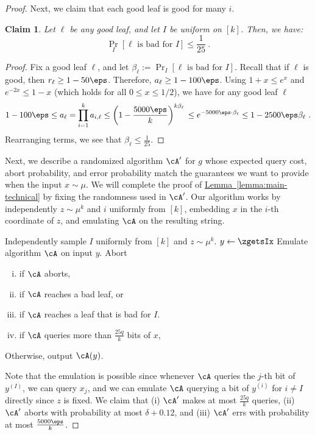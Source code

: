 \documentclass[11pt]{article}
\numberwithin{equation}{section}
\newtheorem{claim}[theorem]{Claim}
\theoremstyle{definition}
\theoremstyle{plain}
\newcommand{\expref}[2]{\hyperref[#2]{#1~\ref{#2}}}
\begin{document}
\begin{proof}
  Next, we claim that each good leaf is good for many $i$.
  \begin{claim}\label{claim:leaf-good-i}
    Let $\ell$ be any good leaf, and let $I$ be uniform on $[k]$.
    Then, we have: $$\Pr_I[\ell \text{ is bad for } I] \leq \frac{1}{25}\ .$$
  \end{claim}
  \begin{proof}
    Fix a good leaf $\ell$, and let
    $\beta_\ell := \Pr_I[\ell \text{ is bad for } I]$.
    Recall that if $\ell$ is good, then $r_\ell \geq 1-50\eps$.
    Therefore, $a_\ell \geq 1-100\eps$.  Using $1+x\leq e^x$ and
    $e^{-2x} \leq 1-x$ (which holds for all $0\leq x \leq 1/2$), we
    have for any good leaf $\ell$
    $$1-100\eps \leq a_\ell = \prod_{i=1}^k a_{i,\ell} \\ \leq
    \left(1-\frac{5000\eps}{k}\right)^{k\beta_\ell} \\ \leq
    e^{-5000\eps\cdot \beta_\ell} \\
    \leq 1-2500\eps\beta_\ell\ .$$ Rearranging terms, we see that
    $\beta_\ell \leq \frac{1}{25}$.
  \end{proof}

  Next, we describe a randomized algorithm $\cA'$ for $g$ whose
  expected query cost, abort probability, and error probability match
  the guarantees we want to provide when the input $x \sim \mu$.
  We will %
  complete the proof of \expref{Lemma}{lemma:main-technical} by
  fixing the randomness used in $\cA'$.  Our algorithm works by
  independently $z \sim \mu^k$ and  $i$ uniformly from $[k]$,
  embedding $x$ in the $i$-th coordinate of $z$, and emulating $\cA$
  on the resulting string.

  \begin{algorithm}
    \caption{$\cA'(x)$}
    \begin{algorithmic}[1]
      \State Independently sample $I$ uniformly from $[k]$ and  $z \sim \mu^k$.
      \State $y \gets \zgetsIx$
      \State Emulate algorithm $\cA$ on input $y$.
      \State Abort
      \begin{enumerate}[(i)]
      \item if $\cA$ aborts,
      \item if $\cA$ reaches a bad leaf, or
      \item if $\cA$ reaches a leaf that is bad for $I$.
      \item if $\cA$ queries more than
        $\frac{25q}{k}$ bits of $x$,
      \end{enumerate}
      \State
      Otherwise, output $\cA(y)$.
    \end{algorithmic}
  \end{algorithm}
  Note that the emulation is possible since whenever $\cA$ queries the
  $j$-th bit of $y^{(I)}$, we can query $x_j$, and we can emulate
  $\cA$ querying a bit of $y^{(i)}$ for $i\neq I$ directly since $z$
  is fixed.  We claim that (i) $\cA'$ makes at most $\frac{25q}{k}$
  queries, (ii) $\cA'$ aborts with probability at most
  $\delta + 0.12$, and (iii) $\cA'$ errs with probability at most
  $\frac{5000\eps}{k}$.


\end{proof}
\end{document}
